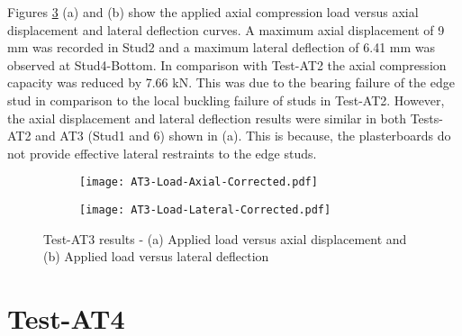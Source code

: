 Figures \ref{fig:AT3-results} (a) and (b) show the applied axial compression load versus axial displacement and lateral deflection curves. A maximum axial displacement of 9 mm was recorded in Stud2 and a maximum lateral deflection of 6.41 mm was observed at Stud4-Bottom. In comparison with Test-AT2 the axial compression capacity was reduced by 7.66 kN. This was due to the bearing failure of the edge stud in comparison to the local buckling failure of studs in Test-AT2. However, the axial displacement and lateral deflection results were similar in both Tests-AT2 and AT3 (Stud1 and 6) shown in  (a). This is because, the plasterboards do not provide effective lateral restraints to the edge studs.
\begin{figure}[!htbp]
	\centering
	\begin{subfigure}[b]{0.6\textwidth}
		\centering
		\texttt{[image: AT3-Load-Axial-Corrected.pdf]}
		\caption{}
		\label{subfig:AT3-Load-Axial-Corrected}
	\end{subfigure}
	\begin{subfigure}[b]{0.6\textwidth}
		\centering
		\texttt{[image: AT3-Load-Lateral-Corrected.pdf]}
		\caption{}
		\label{subfig:AT3-Load-Lateral-Corrected}
	\end{subfigure}
	   \caption{Test-AT3 results - (a) Applied load versus axial displacement and (b) Applied load versus lateral deflection}
	   \label{fig:AT3-results}
\end{figure}

\section{Test-AT4}

